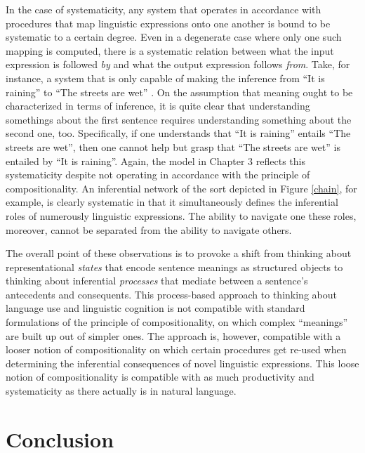 In the case of systematicity, any system that operates in accordance with procedures that map linguistic expressions onto one another is bound to be systematic to a certain degree. Even in a degenerate case where only one such mapping is computed, there is a systematic relation between what the input expression is followed \textit{by} and what the output expression follows \textit{from}. Take, for instance, a system that is only capable of making the inference from ``It is raining'' to ``The streets are wet'' \citep[][p. 313]{Sellars:1954}. On the assumption that meaning ought to be characterized in terms of inference, it is quite clear that understanding somethings about the first sentence requires understanding something about the second one, too. Specifically, if one understands that ``It is raining'' entails ``The streets are wet'', then one cannot help but grasp that ``The streets are wet'' is entailed by ``It is raining''. Again, the model in Chapter 3 reflects this systematicity despite not operating in accordance with the principle of compositionality. An inferential network of the sort depicted in Figure \ref{chain}, for example, is clearly systematic in that it simultaneously defines the inferential roles of numerously linguistic expressions. The ability to navigate one these roles, moreover, cannot be separated from the ability to navigate others. 

The overall point of these observations is to provoke a shift from thinking about representational \textit{states} that encode sentence meanings as structured objects to thinking about inferential \textit{processes} that mediate between a sentence's antecedents and consequents. This process-based approach to thinking about language use and linguistic cognition is not compatible with standard formulations of the principle of compositionality, on which complex ``meanings'' are built up out of simpler ones. The approach is, however, compatible with a looser notion of compositionality on which certain procedures get re-used when determining the inferential consequences of novel linguistic expressions. This loose notion of compositionality is compatible with as much productivity and systematicity as there actually is in natural language. 

\section{Conclusion}

